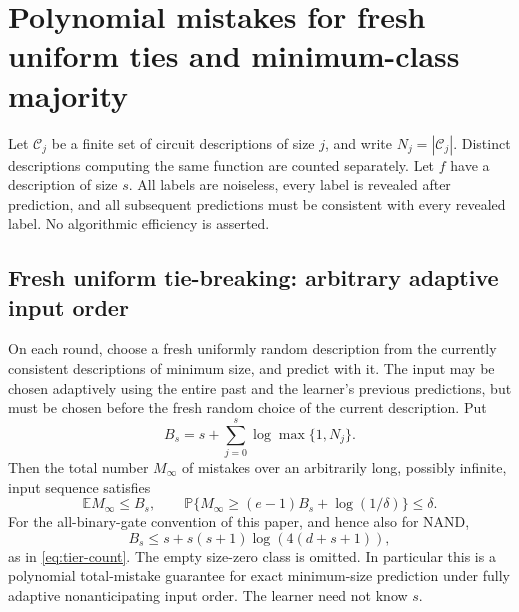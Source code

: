 \section{Polynomial mistakes for fresh uniform ties and minimum-class majority}

Let $\mathcal C_j$ be a finite set of circuit descriptions of size $j$,
and write $N_j=|\mathcal C_j|$. Distinct descriptions computing the same
function are counted separately. Let $f$ have a description of size $s$.
All labels are noiseless, every label is revealed after prediction, and
all subsequent predictions must be consistent with every revealed label.
No algorithmic efficiency is asserted.

\subsection{Fresh uniform tie-breaking: arbitrary adaptive input order}

\begin{theorem}\label{thm:uniform-min}
On each round, choose a fresh uniformly random description from the
currently consistent descriptions of minimum size, and predict with it.
The input may be chosen adaptively using the entire past and the learner's
previous predictions, but must be chosen before the fresh random choice
of the current description. Put
\[
 B_s=s+\sum_{j=0}^s\log\max\{1,N_j\}.
\]
Then the total number $M_\infty$ of mistakes over an arbitrarily long,
possibly infinite, input sequence satisfies
\[
 \mathbb E M_\infty\le B_s,
 \qquad
 \mathbb P\{M_\infty\ge(e-1)B_s+\log(1/\delta)\}\le\delta.
\]
For the all-binary-gate convention of this paper, and hence also for NAND,
\[
 B_s\le s+s(s+1)\log(4(d+s+1)),
\]
as in \eqref{eq:tier-count}. The empty size-zero class is omitted.
In particular this is a polynomial total-mistake guarantee for exact
minimum-size prediction under fully adaptive nonanticipating input order.
The learner need not know $s$.
\end{theorem}

